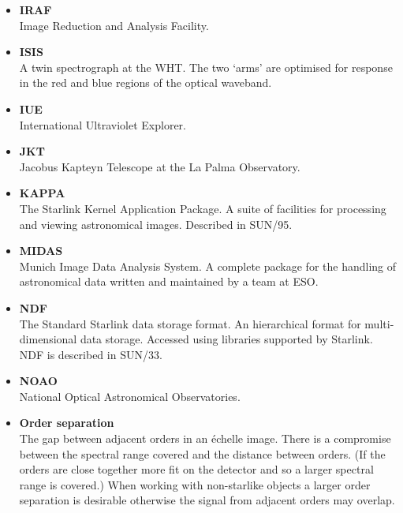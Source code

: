 \documentclass[twoside,11pt]{article}
\newcommand{\xref}[3]{#1}
\begin{document}
\begin{itemize}
\item {\bf\label{gl_iraf}IRAF}\\
      Image Reduction and Analysis Facility.

\item {\bf\label{gl_isis}ISIS}\\
      A twin spectrograph at the WHT.  The two `arms' are optimised
      for response in the red and blue regions of the optical waveband.

\item {\bf\label{gl_iue}IUE}\\
      International Ultraviolet Explorer.

\item {\bf\label{gl_jkt}JKT}\\
      Jacobus Kapteyn Telescope at the La Palma Observatory.

\item {\bf\label{gl_kappa}KAPPA}\\
      The Starlink Kernel Application Package.  A suite of facilities
      for processing and viewing astronomical images.
      Described in \xref{SUN/95}{sun95}{}.

\item {\bf\label{gl_midas}MIDAS}\\
      Munich Image Data Analysis System.  A complete package for the
      handling of astronomical data written and maintained by a team
      at ESO.

\item {\bf\label{gl_ndf}NDF}\\
      The Standard Starlink data storage format.  An hierarchical format for
      multi-dimensional data storage.  Accessed using libraries supported
      by Starlink.  NDF is described in \xref{SUN/33}{sun33}{}.

\item {\bf\label{gl_noao}NOAO}\\
      National Optical Astronomical Observatories.

\item {\bf\label{gl_order_separation}Order separation}\\
      The gap between adjacent orders in an \'{e}chelle image.
      There is a compromise between the spectral range covered and the
      distance between orders.  (If the orders are close together more fit
      on the detector and so a larger spectral range is covered.)
      When working with non-starlike objects a larger order separation
      is desirable otherwise the signal from adjacent orders may overlap.


\end{itemize}
\end{document}
